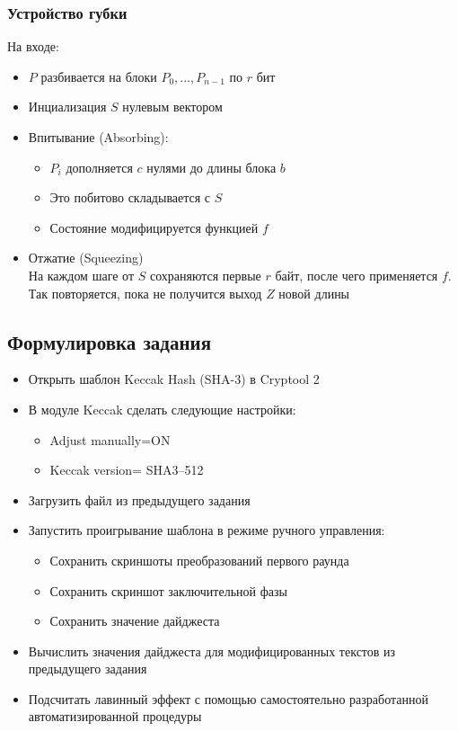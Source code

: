 \documentclass[a4paper, 14pt]{extarticle}
\begin{document}
\subsubsection{Устройство губки}
На входе:
\begin{itemize}
    \item $P$ разбивается на блоки $P_0, \ldots, P_{n-1}$ по $r$ бит
    \item Инциализация $S$ нулевым вектором
    \item Впитывание (Absorbing):
        \begin{itemize}
            \item $P_i$ дополняется $c$ нулями до длины блока $b$
            \item Это побитово складывается с $S$
            \item Состояние модифицируется функцией $f$
        \end{itemize}
    \item Отжатие (Squeezing)\\
    На каждом шаге от $S$ сохраняются первые $r$ байт, после чего применяется $f$. Так повторяется, пока не получится выход $Z$ новой длины

\end{itemize}

\subsection{Формулировка задания}
\begin{itemize}
    \item  Открыть шаблон Keccak Hash (SHA-3) в Cryptool 2
    \item  В модуле Keccak сделать следующие настройки:
    \begin{itemize}
        \item  Adjust manually=ON
        \item  Keccak version= SHA3--512
    \end{itemize}
    \item  Загрузить файл из предыдущего задания
    \item  Запустить проигрывание шаблона в режиме ручного управления:
    \begin{itemize}
        \item  Сохранить скриншоты преобразований первого раунда
        \item  Сохранить скриншот заключительной фазы
        \item  Сохранить значение дайджеста
    \end{itemize}
    \item  Вычислить значения дайджеста для модифицированных текстов из предыдущего задания
    \item  Подсчитать лавинный эффект с помощью самостоятельно разработанной автоматизированной процедуры
\end{itemize}
\end{document}
